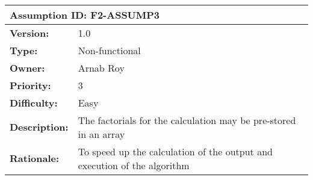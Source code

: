 \documentclass[12pt]{article}
\begin{document}
\\[10pt]
\begin{tabular}{ |p{4cm} | p{10cm}| }
 \hline
 \multicolumn{2}{|l|}{\textbf{Assumption ID: F2-ASSUMP3}} \\
 \hline
 \textbf{Version:} & 1.0\\
 \textbf{Type:} & Non-functional\\
 \textbf{Owner:} & Arnab Roy\\
 \textbf{Priority:} & 3\\
 \textbf{Difficulty:} & Easy\\
 \textbf{Description:} & The factorials for the calculation may be pre-stored in an array \\
 \textbf{Rationale:} & To speed up the calculation of the output and execution of the algorithm\\
 \hline
\end{tabular}
\end{document}

